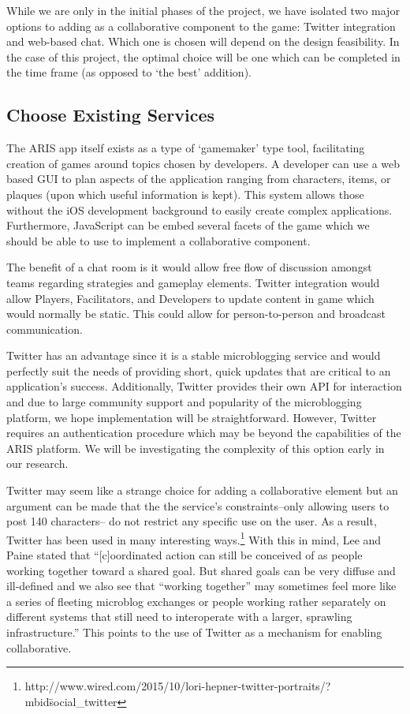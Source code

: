 \documentclass{sigchi}
\begin{document}
While we are only in the initial phases of the project, we have isolated two major options to adding as a collaborative component to the game: Twitter integration and web-based chat. Which one is chosen will depend on the design feasibility. In the case of this project, the optimal choice will be one which can be completed in the time frame (as opposed to ‘the best’ addition).

\subsection{Choose Existing Services}
The ARIS app itself exists as a type of ‘gamemaker’ type tool, facilitating creation of games around topics chosen by developers. A developer can use a web based GUI to plan aspects of the application ranging from characters, items, or plaques (upon which useful information is kept). This system allows those without the iOS development background to easily create complex applications. Furthermore, JavaScript can be embed several facets of the game which we should be able to use to implement a collaborative component. 

The benefit of a chat room is it would allow free flow of discussion amongst teams regarding strategies and gameplay elements. Twitter integration would allow Players, Facilitators, and Developers to update content in game which would normally be static. This could allow for person-to-person and broadcast communication. 

Twitter has an advantage since it is a stable microblogging service and would perfectly suit the needs of providing short, quick updates that are critical to an application’s success. Additionally, Twitter provides their own API for interaction and due to large community support and popularity of the microblogging platform, we hope implementation will be straightforward. However, Twitter requires an authentication procedure which may be beyond the capabilities of the ARIS platform. We will be investigating the complexity of this option early in our research.

Twitter may seem like a strange choice for adding a collaborative element but an argument can be made that the the service’s constraints--only allowing users to post 140 characters-- do not restrict any specific use on the user. As a result, Twitter has been used in many interesting ways.\footnote{http://www.wired.com/2015/10/lori-hepner-twitter-portraits/?mbid\=social\_twitter} With this in mind, Lee and Paine stated that  ``[c]oordinated action can still be conceived of as people working together toward a shared goal. But shared goals can be very diffuse and ill-defined and we also see that “working together” may sometimes feel more like a series of fleeting microblog exchanges or people working rather separately on different systems that still need to interoperate with a larger, sprawling infrastructure.''\cite{lee2015matrix} This points to the use of Twitter as a mechanism for enabling collaborative.
\end{document}
